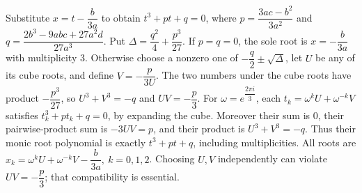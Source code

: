 Substitute $x=t-\dfrac{b}{3a}$ to obtain $t^3+pt+q=0$, where $p=\dfrac{3ac-b^2}{3a^2}$ and $q=\dfrac{2b^3-9abc+27a^2d}{27a^3}$. Put $\Delta=\dfrac{q^2}{4}+\dfrac{p^3}{27}$. If $p=q=0$, the sole root is $x=-\dfrac{b}{3a}$ with multiplicity 3. Otherwise choose a nonzero one of $-\dfrac{q}{2}\pm\sqrt\Delta$, let $U$ be any of its cube roots, and define $V=-\dfrac{p}{3U}$. The two numbers under the cube roots have product $-\dfrac{p^3}{27}$, so $U^3+V^3=-q$ and $UV=-\dfrac{p}{3}$. For $\omega=e^{\dfrac{2\pi i}{3}}$, each $t_k=\omega^kU+\omega^{-k}V$ satisfies $t_k^3+pt_k+q=0$, by expanding the cube. Moreover their sum is 0, their pairwise-product sum is $-3UV=p$, and their product is $U^3+V^3=-q$. Thus their monic root polynomial is exactly $t^3+pt+q$, including multiplicities. All roots are $\boxed{x_k=\omega^kU+\omega^{-k}V-\dfrac{b}{3a},\ k=0,1,2}$. Choosing $U,V$ independently can violate $UV=-\dfrac{p}{3}$; that compatibility is essential.
